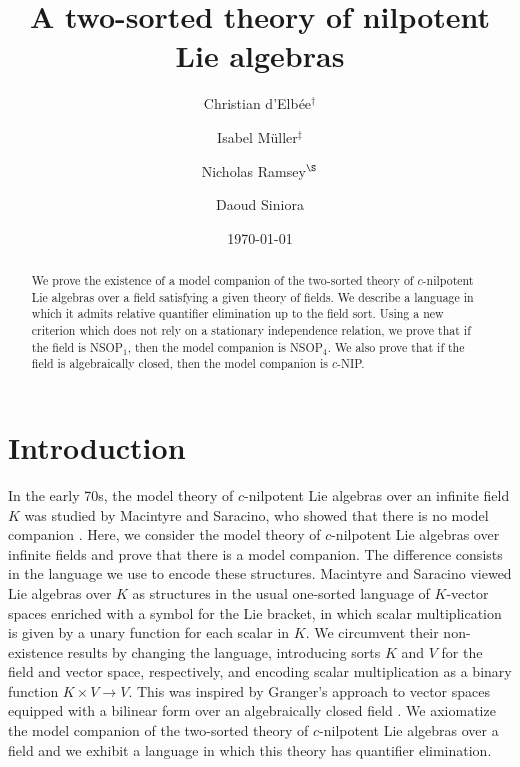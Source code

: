 \documentclass[psamsfonts]{amsart}
\title{A two-sorted theory of nilpotent Lie algebras}
\author[C. d'Elb\'{e}e]{Christian d\textquoteright Elb\'ee$^\dagger$}
\author[I. M\"uller]{Isabel M\"uller$^\ddagger$}
\author[N. Ramsey]{Nicholas Ramsey$^\S$}
\author[D. Siniora]{Daoud Siniora}
\date{\today}
\theoremstyle{definition}
\theoremstyle{definition}
\theoremstyle{remark}
\numberwithin{equation}{section}
\begin{document}
\maketitle

\begin{abstract}
We prove the existence of a model companion of the two-sorted theory of $c$-nilpotent Lie algebras over a field satisfying a given theory of fields. We describe a language in which it admits relative quantifier elimination up to the field sort. Using a new criterion which does not rely on a stationary independence relation, we prove that if the field is NSOP$_1$, then the model companion is NSOP$_4$. We also prove that if the field is algebraically closed, then the model companion is $c$-NIP.
\end{abstract}

\setcounter{tocdepth}{1}
\tableofcontents



\section{Introduction}

In the early 70s, the model theory of $c$-nilpotent Lie algebras over an infinite field $K$ was studied by Macintyre and Saracino, who showed that there is no model companion  \cite{macintyre1974existentially, macintyre1974existentially2}.  Here, we consider the model theory of $c$-nilpotent Lie algebras over infinite fields and prove that there is a model companion.  The difference consists in the language we use to encode these structures.  Macintyre and Saracino viewed Lie algebras over $K$ as structures in the usual one-sorted language of $K$-vector spaces enriched with a symbol for the Lie bracket, in which scalar multiplication is given by a unary function for each scalar in $K$.  We circumvent their non-existence results by changing the language, introducing sorts $K$ and $V$ for the field and vector space, respectively, and encoding scalar multiplication as a binary function $K \times V \to V$.  This was inspired by Granger's approach to vector spaces equipped with a bilinear form over an algebraically closed field \cite{granger1999stability}. We axiomatize the model companion of the two-sorted theory of $c$-nilpotent Lie algebras over a field and we exhibit a language in which this theory has quantifier elimination. 
\end{document}
